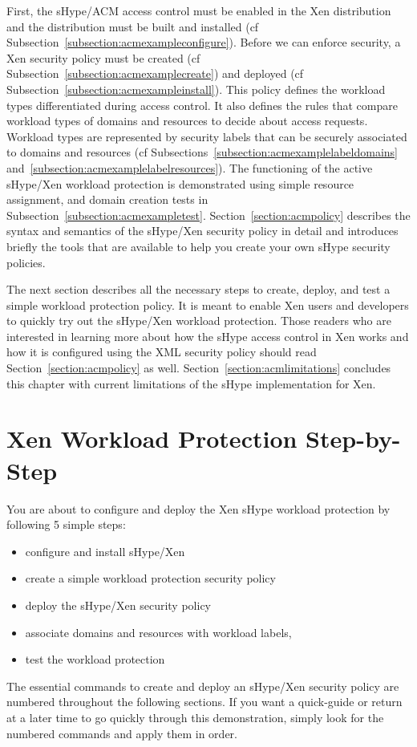 \documentclass[11pt,twoside,final,openright]{report}
\begin{document}
First, the sHype/ACM access control must be enabled in the Xen
distribution and the distribution must be built and installed (cf
Subsection~\ref{subsection:acmexampleconfigure}). Before we can
enforce security, a Xen security policy must be created (cf
Subsection~\ref{subsection:acmexamplecreate}) and deployed (cf
Subsection~\ref{subsection:acmexampleinstall}).  This policy defines
the workload types differentiated during access control. It also
defines the rules that compare workload types of domains and resources
to decide about access requests. Workload types are represented by
security labels that can be securely associated to domains and resources (cf
Subsections~\ref{subsection:acmexamplelabeldomains}
and~\ref{subsection:acmexamplelabelresources}).  The functioning of
the active sHype/Xen workload protection is demonstrated using simple
resource assignment, and domain creation tests in
Subsection~\ref{subsection:acmexampletest}.
Section~\ref{section:acmpolicy} describes the syntax and semantics of
the sHype/Xen security policy in detail and introduces briefly the
tools that are available to help you create your own sHype security policies.

The next section describes all the necessary steps to create, deploy,
and test a simple workload protection policy. It is meant to enable
Xen users and developers to quickly try out the sHype/Xen workload
protection. Those readers who are interested in learning more about
how the sHype access control in Xen works and how it is configured
using the XML security policy should read Section~\ref{section:acmpolicy}
as well. Section~\ref{section:acmlimitations} concludes this chapter with
current limitations of the sHype implementation for Xen.

\section{Xen Workload Protection Step-by-Step}
\label{section:acmexample}

You are about to configure and deploy the Xen sHype workload protection
by following 5 simple steps:
\begin{itemize}
\item configure and install sHype/Xen
\item create a simple workload protection security policy
\item deploy the sHype/Xen security policy
\item associate domains and resources with workload labels,
\item test the workload protection
\end{itemize}
The essential commands to create and deploy an sHype/Xen security
policy are numbered throughout the following sections. If you want a
quick-guide or return at a later time to go quickly through this
demonstration, simply look for the numbered commands and apply them in
order.
\end{document}
